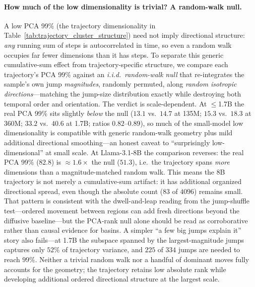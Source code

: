 \paragraph{How much of the low dimensionality is trivial? A random-walk null.} A low PCA 99\% (the trajectory dimensionality in Table~\ref{tab:trajectory_cluster_structure}) need not imply directional structure: \emph{any} running sum of steps is autocorrelated in time, so even a random walk occupies far fewer dimensions than it has steps. To separate this generic cumulative-sum effect from trajectory-specific structure, we compare each trajectory's PCA 99\% against an \emph{i.i.d.\ random-walk null} that re-integrates the sample's own jump \emph{magnitudes}, randomly permuted, along \emph{random isotropic directions}---matching the jump-size distribution exactly while destroying both temporal order and orientation. The verdict is scale-dependent. At $\le$1.7B the real PCA 99\% sits slightly \emph{below} the null ($13.1$ vs.\ $14.7$ at 135M; $15.3$ vs.\ $18.3$ at 360M; $33.2$ vs.\ $40.6$ at 1.7B; ratios $0.82$--$0.89$), so much of the small-model low dimensionality is compatible with generic random-walk geometry plus mild additional directional smoothing---an honest caveat to ``surprisingly low-dimensional'' at small scale. At Llama-3.1-8B the comparison reverses: the real PCA 99\% ($82.8$) is ${\approx}1.6\times$ the null ($51.3$), i.e.\ the trajectory spans \emph{more} dimensions than a magnitude-matched random walk. This means the 8B trajectory is not merely a cumulative-sum artifact: it has additional organized directional spread, even though the absolute count ($83$ of $4096$) remains small. That pattern is consistent with the dwell-and-leap reading from the jump-shuffle test---ordered movement between regions can add fresh directions beyond the diffusive baseline---but the PCA-rank null alone should be read as corroborative rather than causal evidence for basins. A simpler ``a few big jumps explain it'' story also fails---at 1.7B the subspace spanned by the largest-magnitude jumps captures only $52\%$ of trajectory variance, and $225$ of $334$ jumps are needed to reach $99\%$. Neither a trivial random walk nor a handful of dominant moves fully accounts for the geometry; the trajectory retains low absolute rank while developing additional ordered directional structure at the largest scale.

